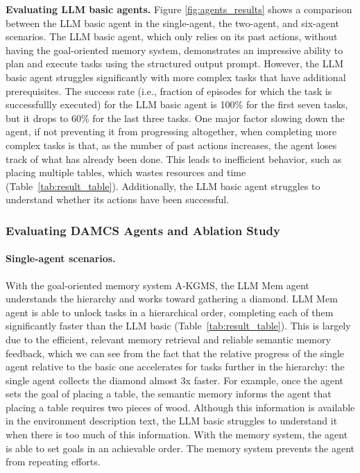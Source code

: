\textbf{Evaluating LLM basic agents. } Figure \ref{fig:agents_results} shows a comparison between the LLM basic agent in the single-agent, the two-agent, and six-agent scenarios. The LLM basic agent, which only relies on its past actions, without having the goal-oriented memory system, demonstrates an impressive ability to plan and execute tasks using the structured output prompt. However, the LLM basic agent struggles significantly with more complex tasks that have additional prerequisites. The success rate (i.e., fraction of episodes for which the task is successfullly executed) for the LLM basic agent is 100\% for the first seven tasks, but it drops to 60\% for the last three tasks. One major factor slowing down the agent, if not preventing it from progressing altogether, when completing more complex tasks is that, as the number of past actions increases, the agent loses track of what has already been done. This leads to inefficient behavior, such as placing multiple tables, which wastes resources and time (Table~\ref{tab:result_table}). Additionally, the LLM basic agent struggles to understand whether its actions have been successful.

\subsubsection{Evaluating DAMCS Agents and Ablation Study}

\paragraph{\textbf{Single-agent scenarios.}} With the goal-oriented memory system A-KGMS, the LLM Mem agent understands the hierarchy and works toward gathering a diamond. LLM Mem agent is able to unlock tasks in a hierarchical order, completing each of them significantly faster than the LLM basic (Table~\ref{tab:result_table}). This is largely due to the efficient, relevant memory retrieval and reliable semantic memory feedback, which we can see from the fact that the relative progress of the single agent relative  to the basic one accelerates for tasks further in the hierarchy: the single agent collects the diamond almost 3x faster. For example, once the agent sets the goal of placing a table, the semantic memory informs the agent that placing a table requires two pieces of wood. Although this information is available in the environment description text, the LLM basic struggles to understand it when there is too much of this information. With the memory system, the agent is able to set goals in an achievable order. The memory system prevents the agent from repeating efforts.


